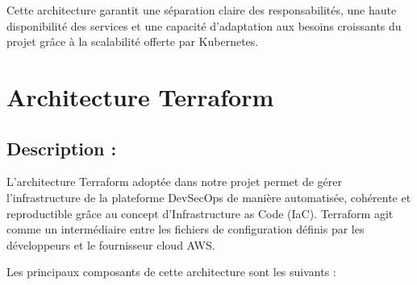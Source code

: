 Cette architecture garantit une séparation claire des responsabilités, une haute disponibilité des services et une capacité d’adaptation aux besoins croissants du projet grâce à la scalabilité offerte par Kubernetes.
\section{Architecture Terraform}

\subsection{Description :}

L’architecture Terraform adoptée dans notre projet permet de gérer l’infrastructure de la plateforme DevSecOps de manière automatisée, cohérente et reproductible grâce au concept d’Infrastructure as Code (IaC). Terraform agit comme un intermédiaire entre les fichiers de configuration définis par les développeurs et le fournisseur cloud AWS.

Les principaux composants de cette architecture sont les suivants :

